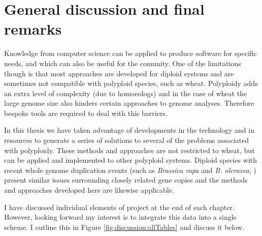 
\chapter[General discussion]{General discussion and final remarks}
\label{cha:discussion}



Knowledge from  computer science can be applied to produce software for specific needs, and which can also be useful for the comunity. 
One of the limitations though is that most approaches are developed for diploid systems and are sometimes not compatible with polyploid species, such as wheat. 
Polyploidy adds an extra level of complexity (due to homoeologs) and in the case of wheat the large genome size also hinders certain approaches to genome analyses. Therefore bespoke tools are required to deal with this barriers. 

In this thesis we have taken advantage of developments in the technology and in resources to generate a series of solutions to several of the problems associated with polyploidy. These methods and approaches are not restricted to wheat, but can be applied and implemented to other polyploid systems.
Diploid species with recent whole genome duplication events (such as \textit{Brassica rapa} and \textit{B. oleracea}; \citealt{Cheng2014}) present similar issues surrounding closely related gene copies and the methods and approaches developed here are likewise applicable.

I have discussed individual elements of project at the end of each chapter. However, looking forward my interest is to integrate this data into a single scheme. I outline this in Figure \ref{fig:discussion:allTables} and discuss it below. 

